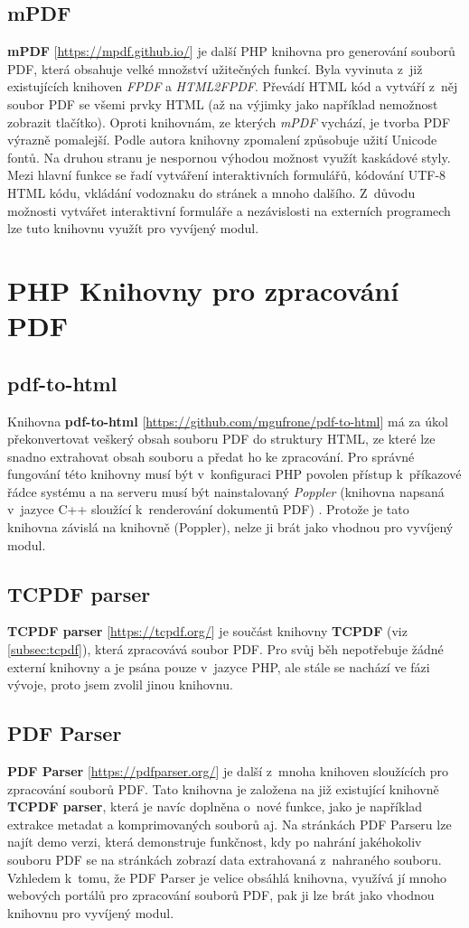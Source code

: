 \subsection{mPDF}
\textbf{mPDF} [\url{https://mpdf.github.io/}] je další PHP knihovna pro generování souborů PDF, která obsahuje velké množství užitečných funkcí. Byla vyvinuta z~již existujících knihoven \textit{FPDF} a \textit{HTML2FPDF}. Převádí HTML kód a vytváří z~něj soubor PDF se všemi prvky HTML (až na výjimky jako například nemožnost zobrazit tlačítko). Oproti knihovnám, ze kterých \textit{mPDF} vychází, je tvorba PDF výrazně pomalejší. Podle autora knihovny zpomalení způsobuje užití Unicode fontů. Na druhou stranu je nespornou výhodou možnost využít kaskádové styly. Mezi hlavní funkce se řadí vytváření interaktivních formulářů, kódování UTF-8 HTML kódu, vkládání vodoznaku do stránek a mnoho dalšího. Z~důvodu možnosti vytvářet interaktivní formuláře a nezávislosti na externích programech lze tuto knihovnu využít pro vyvíjený modul.
\section{PHP Knihovny pro zpracování PDF}
\subsection{pdf-to-html}
Knihovna \textbf{pdf-to-html} [\url{https://github.com/mgufrone/pdf-to-html}] má za úkol překonvertovat veškerý obsah souboru PDF do struktury HTML, ze které lze snadno extrahovat obsah souboru a předat ho ke zpracování. Pro správné fungování této knihovny musí být v~konfiguraci PHP povolen přístup k~příkazové řádce systému a na serveru musí být nainstalovaný \textit{Poppler} (knihovna napsaná v~jazyce C++ sloužící k~renderování dokumentů PDF) \cite{pdfToHtml}. Protože je tato knihovna závislá na knihovně (Poppler), nelze ji brát jako vhodnou pro vyvíjený modul. 
\subsection{TCPDF parser}
\textbf{TCPDF parser} [\url{https://tcpdf.org/}] je součást knihovny \textbf{TCPDF} (viz \ref{subsec:tcpdf}), která zpracovává soubor PDF. Pro svůj běh nepotřebuje žádné externí knihovny a je psána pouze v~jazyce PHP, ale stále se nachází ve fázi vývoje, proto jsem zvolil jinou knihovnu.

\subsection{PDF Parser}
\textbf{PDF Parser} [\url{https://pdfparser.org/}] je další z~mnoha knihoven sloužících pro zpracování souborů PDF. Tato knihovna je založena na již existující knihovně \textbf{TCPDF parser}, která je navíc doplněna o~nové funkce, jako je například extrakce metadat a komprimovaných souborů aj. Na stránkách PDF Parseru lze najít demo verzi, která demonstruje funkčnost, kdy po nahrání jakéhokoliv souboru PDF se na stránkách zobrazí data extrahovaná z~nahraného souboru. Vzhledem k~tomu, že PDF Parser je velice obsáhlá knihovna, využívá jí mnoho webových portálů pro zpracování souborů PDF, pak ji lze brát jako vhodnou knihovnu pro vyvíjený modul.

